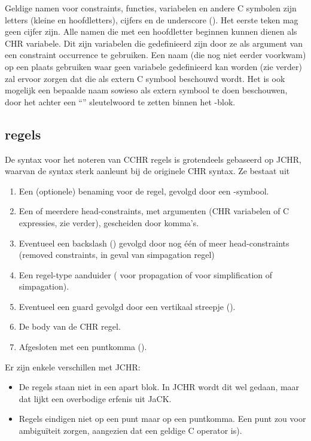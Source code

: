 Geldige namen voor constraints, functies, variabelen en andere C symbolen zijn letters (kleine en hoofdletters), cijfers en de underscore (\code{\_}). Het eerste teken mag geen cijfer zijn. Alle namen die met een hoofdletter beginnen kunnen dienen als CHR variabele. Dit zijn variabelen die gedefinieerd zijn door ze als argument van een constraint occurrence te gebruiken. Een naam (die nog niet eerder voorkwam) op een plaats gebruiken waar geen variabele gedefinieerd kan worden (zie verder) zal ervoor zorgen dat die als extern C symbool beschouwd wordt. Het is ook mogelijk een bepaalde naam sowieso als extern symbool te doen beschouwen, door het achter een ``'' sleutelwoord te zetten binnen het -blok.

\subsection{regels} \label{sec:rules}

De syntax voor het noteren van CCHR regels is grotendeels gebaseerd op JCHR, waarvan de syntax sterk aanleunt bij de
originele CHR syntax. Ze bestaat uit \begin{enumerate}
  \item Een (optionele) benaming voor de regel, gevolgd door een -symbool.
  \item Een of meerdere head-constraints, met argumenten (CHR variabelen of C expressies, zie verder), gescheiden door komma's.
  \item Eventueel een backslash (\code{$\backslash$}) gevolgd door nog \'e\'en of meer head-constraints (removed constraints, in geval van simpagation regel)
  \item Een regel-type aanduider (\code{==>} voor propagation of \code{<=>} voor simplification of simpagation).
  \item Eventueel een guard gevolgd door een vertikaal streepje (\code{|}).
  \item De body van de CHR regel.
  \item Afgesloten met een puntkomma (\code{;}).
\end{enumerate}

Er zijn enkele verschillen met JCHR: \begin{itemize}
  \item De regels staan niet in een apart  blok. In JCHR wordt dit wel gedaan, maar dat lijkt een overbodige erfenis uit JaCK.
  \item Regels eindigen niet op een punt maar op een puntkomma. Een punt zou voor ambigu\"iteit zorgen, aangezien dat een geldige C operator is).
\end{itemize}

